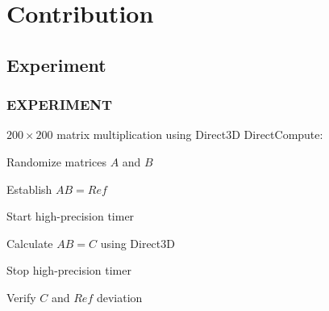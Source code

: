 \section{Contribution}

\subsection{Experiment}
\begin{frame}
\frametitle{EXPERIMENT}

$200\times 200$ matrix multiplication using Direct3D DirectCompute:

\begin{enumerate*}
\item Randomize matrices $A$ and $B$
\item Establish $AB=Ref$
\item Start high-precision timer
\item Calculate $AB=C$ using Direct3D
\item Stop high-precision timer
\item Verify $C$ and $Ref$ deviation
\end{enumerate*}

\end{frame}

